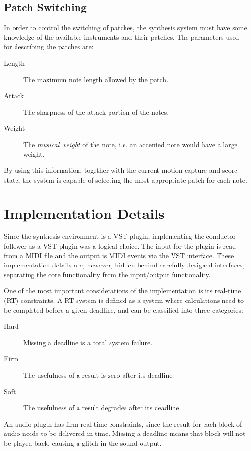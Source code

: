 \section{Patch Switching}

In order to control the switching of patches,
the synthesis system must have some knowledge of
the available instruments and their patches.
The parameters used for describing the patches are:
\begin{description}
\item[Length] The maximum note length allowed by the patch.
\item[Attack] The sharpness of the attack portion of the notes.
\item[Weight] The \textit{musical weight} of the note, i.e. an accented note would have a large weight.
\end{description}
By using this information,
together with the current motion capture and score state,
the system is capable of selecting
the most appropriate patch for each note.


\chapter{Implementation Details}
\label{chapter:implementation_details}

Since the synthesis environment is a VST plugin,
implementing the conductor follower as a VST plugin was a logical choice.
The input for the plugin is read from a MIDI file
and the output is MIDI events via the VST interface.
These implementation details are, however, hidden behind
carefully designed interfaces,
separating the core functionality from the input/output functionality.

One of the most important considerations of the implementation
is its real-time (RT) constraints.
A RT system is defined as a system where calculations
need to be completed before a given deadline,
and can be classified into three categories:
\begin{description}
\item[Hard]
Missing a deadline is a total system failure.
\item[Firm]
The usefulness of a result is zero after its deadline.
\item[Soft]
The usefulness of a result degrades after its deadline.
\end{description}
An audio plugin has firm real-time constraints,
since the result for each block of audio needs to be delivered in time.
Missing a deadline means that block will not be played back,
causing a glitch in the sound output.

